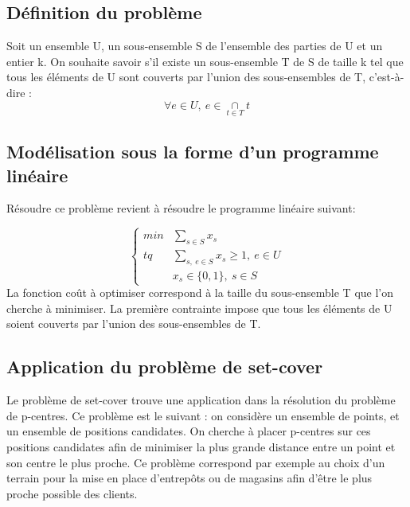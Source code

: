 \documentclass[12pt]{report}
\begin{document}
\subsection{Définition du problème}

Soit un ensemble U, un sous-ensemble S de l'ensemble des parties de U et un entier k. On souhaite savoir s'il existe un sous-ensemble T de S de taille k tel que tous les éléments de U sont couverts par l'union des sous-ensembles de T, c'est-à-dire :
$$
\forall e \in U, \ e \in \underset{t \in T}{\cap}t
$$

\subsection{Modélisation sous la forme d'un programme linéaire}

Résoudre ce problème revient à résoudre le programme linéaire suivant:

$$
\left\{
    \begin{array}{ll}
        min &  \underset{s \in S}{\sum}x_s \\
        tq &  \underset{s , \ e\in S} {\sum}x_s \ge 1, \ e \in U \\
         & x_s \in \{ 0,1 \}, \  s \in S
    \end{array}
\right.
$$
La fonction coût à optimiser correspond à la taille du sous-ensemble T que l'on cherche à minimiser. La première contrainte impose que tous les éléments de U soient couverts par l'union des sous-ensembles de T. 

\subsection{Application du problème de set-cover}

Le problème de set-cover trouve une application dans la résolution du problème de p-centres. Ce problème est le suivant : on considère un ensemble de points, et un ensemble de positions candidates. On cherche à placer p-centres sur ces positions candidates afin de minimiser la plus grande distance entre un point et son centre le plus proche. Ce problème correspond par exemple au choix d'un terrain pour la mise en place d'entrepôts ou de magasins afin d'être le plus proche possible des clients.
\end{document}
